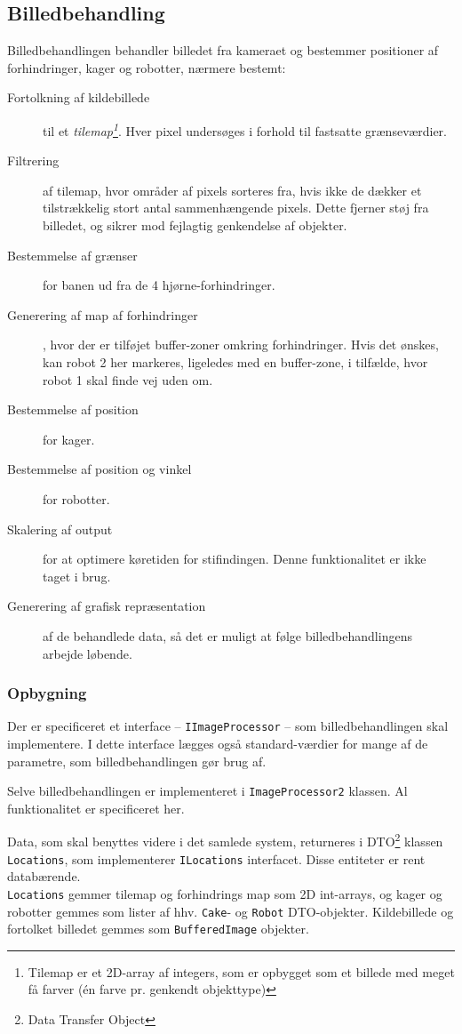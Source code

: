 \subsection{Billedbehandling}
Billedbehandlingen behandler billedet fra kameraet og bestemmer positioner af forhindringer, kager og robotter, nærmere bestemt:
\begin{description}
	\item[Fortolkning af kildebillede] til et \textit{tilemap\footnote{Tilemap er et 2D-array af integers, som er opbygget som et billede med meget få farver (én farve pr. genkendt objekttype)}}. Hver pixel undersøges i forhold til fastsatte grænseværdier.
	\item[Filtrering] af tilemap, hvor områder af pixels sorteres fra, hvis ikke de dækker et tilstrækkelig stort antal sammenhængende pixels. Dette fjerner støj fra billedet, og sikrer mod fejlagtig genkendelse af objekter.
	\item[Bestemmelse af grænser] for banen ud fra de 4 hjørne-forhindringer.
	\item[Generering af map af forhindringer], hvor der er tilføjet buffer-zoner omkring forhindringer. Hvis det ønskes, kan robot 2 her markeres, ligeledes med en buffer-zone, i tilfælde, hvor robot 1 skal finde vej uden om.
	\item[Bestemmelse af position] for kager.
	\item[Bestemmelse af position og vinkel] for robotter.
	\item[Skalering af output] for at optimere køretiden for stifindingen. Denne funktionalitet er ikke taget i brug.
	\item[Generering af grafisk repræsentation] af de behandlede data, så det er muligt at følge billedbehandlingens arbejde løbende.
\end{description}

\subsubsection{Opbygning}
Der er specificeret et interface -- \texttt{IImageProcessor} -- som billedbehandlingen skal implementere. I dette interface lægges også standard-værdier for mange af de parametre, som billedbehandlingen gør brug af.

Selve billedbehandlingen er implementeret i \texttt{ImageProcessor2} klassen. Al funktionalitet er specificeret her.

Data, som skal benyttes videre i det samlede system, returneres i DTO\footnote{Data Transfer Object} klassen \texttt{Locations}, som implementerer \texttt{ILocations} interfacet. Disse entiteter er rent databærende.\\
\texttt{Locations} gemmer tilemap og forhindrings map som 2D int-arrays, og kager og robotter gemmes som lister af hhv. \texttt{Cake}- og \texttt{Robot} DTO-objekter. Kildebillede og fortolket billedet gemmes som \texttt{BufferedImage} objekter.

